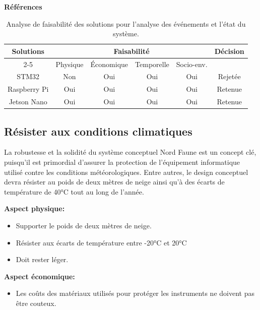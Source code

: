 \noindent\textbf{Références} 
\cite{Jetson1}
\cite{Jetson2}
\cite{Jetson3}

\begin{table}[H]
    \centering
\begin{tabular}{|c|c|c|c|c|c|}
    \hline
    \centering
    \textbf{Solutions} & \multicolumn{4}{c|}{Faisabilité} & \textbf{Décision} \\
    \cline{2-5}
    & Physique & Économique & Temporelle & Socio-env. & \\
    \hline
    STM32 & Non & Oui & Oui & Oui & Rejetée \\
    \hline
    Raspberry Pi & Oui & Oui & Oui & Oui & Retenue \\
    \hline
    Jetson Nano & Oui & Oui & Oui & Oui & Retenue \\
    \hline
\end{tabular}
\caption{Analyse de faisabilité des solutions pour l'analyse des événements et l'état du système.}
\label{tab:faisabiliteEvenement}
\end{table}


\subsection{Résister aux conditions climatiques}
\label{RésisterAuxConditions}
La robustesse et la solidité du système conceptuel Nord Faune est un concept clé, puisqu'il est primordial d'assurer la protection de l'équipement informatique utilisé contre les conditions météorologiques. Entre autres, le design conceptuel devra résister au poids de deux mètres de neige ainsi qu'à des écarts de température de 40°C tout au long de l'année.
\bigskip

\noindent\textbf{Aspect physique:}
\begin{itemize}
    \item Supporter le poids de deux mètres de neige.
    \item Résister aux écarts de température entre -20°C et 20°C
    \item Doit rester léger.
\end{itemize}

\noindent\textbf{Aspect économique:}
\begin{itemize}
    \item Les coûts des matériaux utilisés pour protéger les instruments ne doivent pas être couteux.
\end{itemize}

